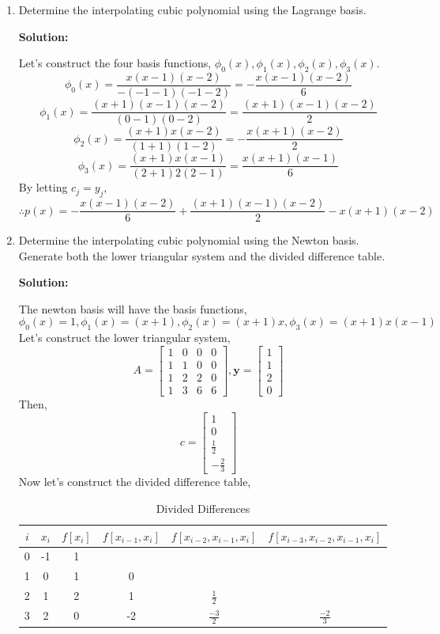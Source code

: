 \documentclass[11pt]{article}
\newenvironment{solution}
  {\par\noindent\textbf{Solution:}\par}
  {\par}
\begin{document}
\begin{enumerate}
\begin{enumerate}
\item Determine the interpolating cubic polynomial using the Lagrange basis.
  \begin{solution}
    Let's construct the four basis functions, $\phi_0(x),\phi_1(x),\phi_2(x),\phi_3(x)$.
    $$\phi_0(x) = \frac{x(x-1)(x-2)}{-(-1-1)(-1-2)} = -\frac{x(x-1)(x-2)}{6}$$
    $$\phi_1(x) = \frac{(x+1)(x-1)(x-2)}{(0-1)(0-2)}= \frac{(x+1)(x-1)(x-2)}{2}$$
    $$\phi_2(x) = \frac{(x+1)x(x-2)}{(1+1)(1-2)}=-\frac{x(x+1)(x-2)}{2}$$
    $$\phi_3(x) = \frac{(x+1)x(x-1)}{(2+1)2(2-1)}=\frac{x(x+1)(x-1)}{6}$$
    By letting $c_j = y_j$, 
    $$\therefore p(x) =  -\frac{x(x-1)(x-2)}{6} +\frac{(x+1)(x-1)(x-2)}{2} -  x(x+1)(x-2)$$
  \end{solution}
\item Determine the interpolating cubic polynomial using the Newton basis. Generate both the lower triangular system and the divided difference table.
  \begin{solution}
    The newton basis will have the basis functions,
    $$\phi_0(x) = 1, \phi_1(x) = (x+1), \phi_2(x) = (x+1)x, \phi_3(x) = (x+1)x(x-1)$$
    Let's construct the lower triangular system,
    $$A= \begin{bmatrix}
      1 & 0 & 0 & 0 \\ 
      1 & 1 & 0 & 0 \\ 
      1 & 2 & 2 & 0 \\ 
      1 & 3 & 6 & 6 
      \end{bmatrix}, \textbf{y} = \begin{bmatrix} 1 \\ 1 \\ 2 \\ 0 \end{bmatrix}$$
    Then, $$c = \begin{bmatrix} 1 \\ 0 \\ \frac{1}{2} \\[3pt] -\frac{2}{3} \end{bmatrix}$$
    Now let's construct the divided difference table, 
    \begin{table}[h]
    \centering
    \begin{tabular}{|c|c|c|c|c|c|}
        \hline
        $i$ & $x_i$ & $f[x_i]$ & $f[x_{i-1},x_i]$ & $f[x_{i-2},x_{i-1},x_i]$ &  $f[x_{i-3},x_{i-2},x_{i-1},x_i]$ \\ 
        \hline
        0   & -1    & 1 &      &   &  \\ 
        1   & 0     & 1 &  0   &   &  \\
        2   & 1     & 2 &  1   & $\frac{1}{2}$ &  \\ 
        3   & 2     & 0 & -2   & $\frac{-3}{2}$ & $\frac{-2}{3}$ \\ 
        \hline
    \end{tabular}
    \caption{Divided Differences}
    \end{table}
    

\end{solution}
\end{enumerate}
\end{enumerate}
\end{document}
